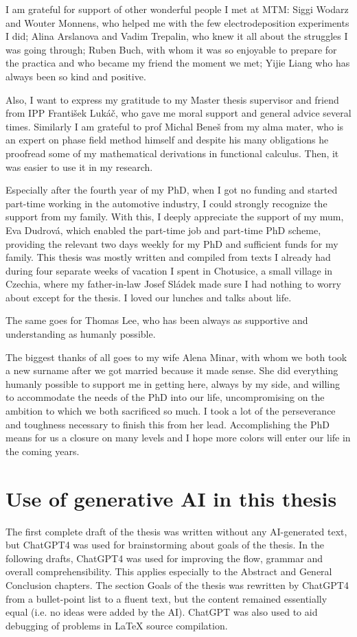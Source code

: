 I am grateful for support of other wonderful people I met at MTM: Siggi Wodarz and Wouter Monnens, who helped me with the few electrodeposition experiments I did; Alina Arslanova and Vadim Trepalin, who knew it all about the struggles I was going through; Ruben Buch, with whom it was so enjoyable to prepare for the practica and who became my friend the moment we met; Yijie Liang who has always been so kind and positive.

Also, I want to express my gratitude to my Master thesis supervisor and friend from IPP František Lukáč, who gave me moral support and general advice several times. Similarly I am grateful to prof Michal Beneš from my alma mater, who is an expert on phase field method himself and despite his many obligations he proofread some of my mathematical derivations in functional calculus. Then, it was easier to use it in my research.

Especially after the fourth year of my PhD, when I got no funding and started part-time working in the automotive industry, I could strongly recognize the support from my family. With this, I deeply appreciate the support of my mum, Eva Dudrová, which enabled the part-time job and part-time PhD scheme, providing the relevant two days weekly for my PhD and sufficient funds for my family. This thesis was mostly written and compiled from texts I already had during four separate weeks of vacation I spent in Chotusice, a small village in Czechia, where my father-in-law Josef Sládek made sure I had nothing to worry about except for the thesis. I loved our lunches and talks about life. 

The same goes for Thomas Lee, who has been always as supportive and understanding as humanly possible.

The biggest thanks of all goes to my wife Alena Minar, with whom we both took a new surname after we got married because it made sense. She did everything humanly possible to support me in getting here, always by my side, and willing to accommodate the needs of the PhD into our life, uncompromising on the ambition to which we both sacrificed so much. I took a lot of the perseverance and toughness necessary to finish this from her lead. Accomplishing the PhD means for us a closure on many levels and I hope more colors will enter our life in the coming years.

\section*{Use of generative AI in this thesis}
The first complete draft of the thesis was written without any AI-generated text, but ChatGPT4 was used for brainstorming about goals of the thesis. In the following drafts, ChatGPT4 was used for improving the flow, grammar and overall comprehensibility. This applies especially to the Abstract and General Conclusion chapters. The section Goals of the thesis was rewritten by ChatGPT4 from a bullet-point list to a fluent text, but the content remained essentially equal (i.e. no ideas were added by the AI). ChatGPT was also used to aid debugging of problems in LaTeX source compilation.

